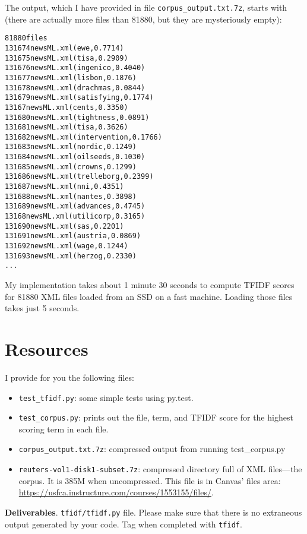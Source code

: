 \begin{fullwidth}
\noindent The output, which I have provided in file {\tt corpus\_output.txt.7z}, starts with (there are actually more files than 81880, but they are mysteriously empty):

\begin{alltt}
81880 files
131674newsML.xml (ewe, 0.7714)
131675newsML.xml (tisa, 0.2909)
131676newsML.xml (ingenico, 0.4040)
131677newsML.xml (lisbon, 0.1876)
131678newsML.xml (drachmas, 0.0844)
131679newsML.xml (satisfying, 0.1774)
13167newsML.xml (cents, 0.3350)
131680newsML.xml (tightness, 0.0891)
131681newsML.xml (tisa, 0.3626)
131682newsML.xml (intervention, 0.1766)
131683newsML.xml (nordic, 0.1249)
131684newsML.xml (oilseeds, 0.1030)
131685newsML.xml (crowns, 0.1299)
131686newsML.xml (trelleborg, 0.2399)
131687newsML.xml (nni, 0.4351)
131688newsML.xml (nantes, 0.3898)
131689newsML.xml (advances, 0.4745)
13168newsML.xml (utilicorp, 0.3165)
131690newsML.xml (sas, 0.2201)
131691newsML.xml (austria, 0.0869)
131692newsML.xml (wage, 0.1244)
131693newsML.xml (herzog, 0.2330)
...
\end{alltt}

My implementation takes about 1 minute 30 seconds to compute TFIDF scores for 81880 XML files loaded from an SSD on a fast machine.  Loading those files takes just 5 seconds.
 
\section{Resources}

I provide for you the following files:

\begin{itemize}
\item {\tt test\_tfidf.py}: some simple tests using py.test.
\item {\tt test\_corpus.py}: prints out the file, term, and TFIDF score for the highest scoring term in each file.
\item {\tt corpus\_output.txt.7z}: compressed output from running test\_corpus.py
\item {\tt reuters-vol1-disk1-subset.7z}: compressed directory full of XML files---the corpus. It is 385M when uncompressed. This file is in Canvas' files area: \href{https://usfca.instructure.com/courses/1553155/files/}{https://usfca.instructure.com/courses/1553155/files/}.
\end{itemize}

\begin{callout}{\bcplume}
{\bf Deliverables}.   {\tt tfidf/tfidf.py} file. Please make sure that there is no extraneous output generated by your code. Tag when completed with {\tt tfidf}.
\end{callout}


\end{fullwidth}
